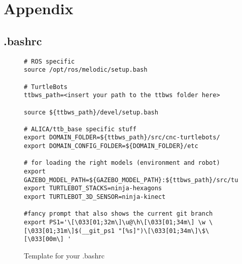 \appendix
\chapter{Appendix}
\label{chap:Appendix}

\begin{landscape}
  \section{.bashrc}
  \label{sec:bashrc}
  \begin{figure}[htbp]
    \begin{verbatim}
# ROS specific 
source /opt/ros/melodic/setup.bash

# TurtleBots
ttbws_path=<insert your path to the ttbws folder here>

source ${ttbws_path}/devel/setup.bash

# ALICA/ttb_base specific stuff
export DOMAIN_FOLDER=${ttbws_path}/src/cnc-turtlebots/
export DOMAIN_CONFIG_FOLDER=${DOMAIN_FOLDER}/etc

# for loading the right models (environment and robot)
export GAZEBO_MODEL_PATH=${GAZEBO_MODEL_PATH}:${ttbws_path}/src/turtlebot/turtlebot_bringup/models
export TURTLEBOT_STACKS=ninja-hexagons
export TURTLEBOT_3D_SENSOR=ninja-kinect

#fancy prompt that also shows the current git branch
export PS1='\[\033[01;32m\]\u@\h\[\033[01;34m\] \w \[\033[01;31m\]$(__git_ps1 "[%s]")\[\033[01;34m\]\$\[\033[00m\] '
    \end{verbatim}
    \caption{Template for your .bashrc}
    \label{fig:template_bashrc}
  \end{figure}
\end{landscape}